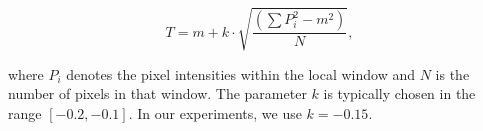 \begin{equation}
    T = m + k \cdot \sqrt{\frac{(\sum P_i^2 - m^2)}{N}},
\end{equation}

where $P_i$ denotes the pixel intensities within the local window and $N$ is the number of pixels in that window.
The parameter $k$ is typically chosen in the range $[-0.2, -0.1]$.
In our experiments, we use $k = -0.15$.
